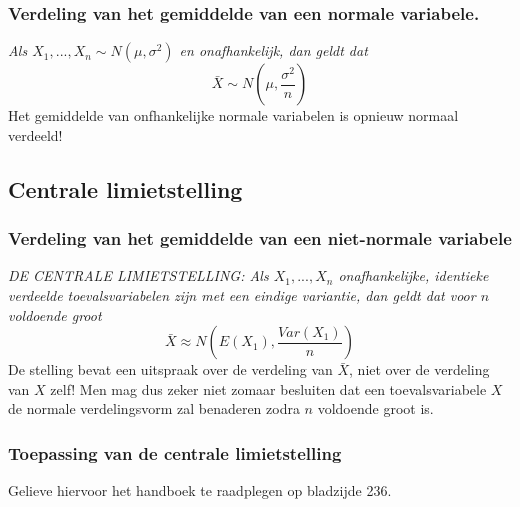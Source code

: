 \documentclass[titlepage]{article}
\numberwithin{equation}{section}
\begin{document}
\subsubsection{Verdeling van het gemiddelde van een normale variabele.}
\emph{Als $X_1, ... , X_n \sim N(\mu,\sigma^2)$ en onafhankelijk, dan geldt dat}
\begin{equation}
	\bar{X} \sim N \left( \mu, \frac{\sigma^2}{n}\right)
	\label{5.4}
\end{equation}
Het gemiddelde van onfhankelijke normale variabelen is opnieuw normaal verdeeld!
\subsection{Centrale limietstelling}
\subsubsection{Verdeling van het gemiddelde van een niet-normale variabele}
\emph{DE CENTRALE LIMIETSTELLING:\newline\newline
Als $X_1, ... , X_n$ onafhankelijke, identieke verdeelde toevalsvariabelen zijn met een eindige variantie, dan geldt dat voor $n$ voldoende groot}
\begin{equation}
	\bar{X} \approx N \left(E(X_1), \frac{Var(X_1)}{n}\right)
	\label{5.5}
\end{equation}
\danger De stelling bevat een uitspraak over de verdeling van $\bar{X}$, niet over de verdeling van $X$ zelf! Men mag dus zeker niet zomaar besluiten dat een toevalsvariabele $X$ de normale verdelingsvorm zal benaderen zodra $n$ voldoende groot is.
\subsubsection{Toepassing van de centrale limietstelling}
Gelieve hiervoor het handboek te raadplegen op bladzijde 236.
\end{document}
